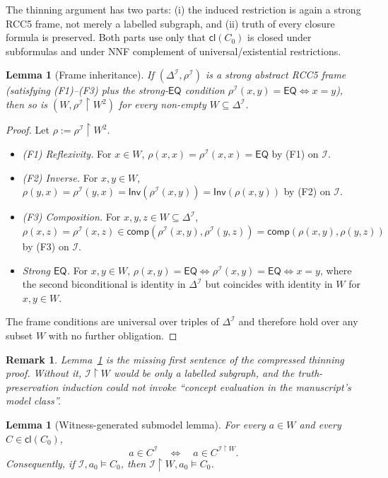 \documentclass[11pt]{article}
\newtheorem{lemma}[theorem]{Lemma}
\newtheorem{remark}[theorem]{Remark}
\newcommand{\EQ}{\mathsf{EQ}}
\newcommand{\comp}{\mathsf{comp}}
\newcommand{\Cl}{\mathsf{cl}}
\newcommand{\I}{\mathcal I}
\begin{document}
The thinning argument has two parts: (i) the induced restriction is
again a strong RCC5 frame, not merely a labelled subgraph, and (ii)
truth of every closure formula is preserved.  Both parts use only
that $\Cl(C_0)$ is closed under subformulas and under NNF complement
of universal/existential restrictions.

\begin{lemma}[Frame inheritance]\label{lem:frame-inherited}
If $(\Delta^\I,\rho^\I)$ is a strong abstract RCC5 frame (satisfying
(F1)--(F3) plus the strong-$\EQ$ condition
$\rho^\I(x,y)=\EQ\iff x=y$), then so is
$(W,\rho^\I\!\upharpoonright\!W^2)$ for every non-empty
$W\subseteq\Delta^\I$.
\end{lemma}

\begin{proof}
Let $\rho:=\rho^\I\!\upharpoonright\!W^2$.
\begin{itemize}[leftmargin=2em]
  \item \emph{(F1) Reflexivity.}  For $x\in W$,
    $\rho(x,x)=\rho^\I(x,x)=\EQ$ by (F1) on $\I$.
  \item \emph{(F2) Inverse.}  For $x,y\in W$,
    $\rho(y,x)=\rho^\I(y,x)=\mathsf{Inv}(\rho^\I(x,y))=\mathsf{Inv}(\rho(x,y))$
    by (F2) on $\I$.
  \item \emph{(F3) Composition.}  For $x,y,z\in W\subseteq\Delta^\I$,
    $\rho(x,z)=\rho^\I(x,z)\in\comp(\rho^\I(x,y),\rho^\I(y,z))=\comp(\rho(x,y),\rho(y,z))$
    by (F3) on $\I$.
  \item \emph{Strong $\EQ$.}  For $x,y\in W$,
    $\rho(x,y)=\EQ\iff\rho^\I(x,y)=\EQ\iff x=y$, where the second
    biconditional is identity in $\Delta^\I$ but coincides with
    identity in $W$ for $x,y\in W$.
\end{itemize}
The frame conditions are universal over triples of $\Delta^\I$ and
therefore hold over any subset $W$ with no further obligation.
\end{proof}

\begin{remark}
Lemma~\ref{lem:frame-inherited} is the missing first sentence of the
compressed thinning proof.  Without it, $\I\!\upharpoonright\!W$
would be only a labelled subgraph, and the truth-preservation
induction could not invoke ``concept evaluation in the manuscript's
model class''.
\end{remark}

\begin{lemma}[Witness-generated submodel lemma]\label{lem:thinning}
For every $a\in W$ and every $C\in\Cl(C_0)$,
\[
  a\in C^\I \quad\Longleftrightarrow\quad a\in C^{\I\upharpoonright W}.
\]
Consequently, if $\I,a_0\models C_0$, then $\I\!\upharpoonright\!W,a_0\models C_0$.
\end{lemma}
\end{document}
